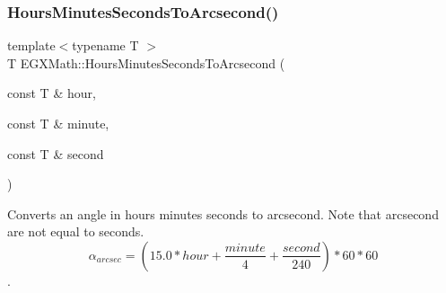 \mbox{\label{group___e_g_x_math-_angle_conversions-_hours_minutes_seconds_ga14620899c81c1f5e65cde96ef4ee626e}} 
\subsubsection{\texorpdfstring{Hours\+Minutes\+Seconds\+To\+Arcsecond()}{HoursMinutesSecondsToArcsecond()}}
{\footnotesize\ttfamily template$<$typename T $>$ \\
T E\+G\+X\+Math\+::\+Hours\+Minutes\+Seconds\+To\+Arcsecond (\begin{DoxyParamCaption}\item[{const T \&}]{hour,  }\item[{const T \&}]{minute,  }\item[{const T \&}]{second }\end{DoxyParamCaption})}



Converts an angle in hours minutes seconds to arcsecond. Note that arcsecond are not equal to seconds. \[\alpha_{arcsec}=(15.0 * hour + \frac{minute}{4} + \frac{second}{240}) * 60 * 60\]. 

